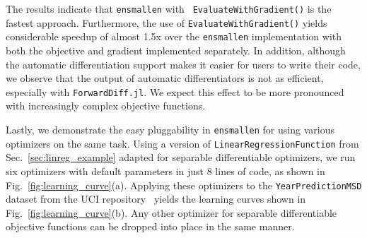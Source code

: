 \documentclass{article}
\begin{document}
The results indicate that \texttt{\small ensmallen} with \texttt{\small
EvaluateWithGradient()} is the fastest approach.
Furthermore, the use of \texttt{\small EvaluateWithGradient()} yields considerable
speedup of almost 1.5x over the \texttt{\small ensmallen} implementation with both the
objective and gradient implemented separately.  In addition, although the
automatic differentiation support makes it easier for users to write their
code, we observe that the output of automatic differentiators is not as
efficient, especially with \texttt{\small ForwardDiff.jl}.  We expect this
effect to be more pronounced with increasingly complex objective functions.

%

Lastly, we demonstrate the easy pluggability in {\tt ensmallen}
for using various optimizers on the same task.
Using a version of \texttt{\small LinearRegressionFunction} from Sec.~\ref{sec:linreg_example}
adapted for separable differentiable optimizers,
we run six optimizers with default parameters in just 8 lines of code,
as shown in Fig.~\ref{fig:learning_curve}(a).
Applying these optimizers to the \texttt{\small YearPredictionMSD}
dataset from the UCI repository~\cite{ucimlrepository}
yields the learning curves shown in Fig.~\ref{fig:learning_curve}(b).
Any other optimizer for separable differentiable objective
functions can be dropped into place in the same manner.
\end{document}
